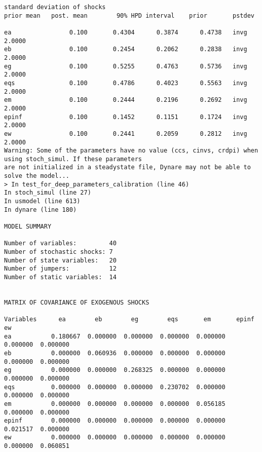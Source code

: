 \documentclass[]{article}
\begin{document}
\begin{verbatim}
standard deviation of shocks
prior mean   post. mean        90% HPD interval    prior       pstdev

ea                0.100       0.4304      0.3874      0.4738   invg        2.0000
eb                0.100       0.2454      0.2062      0.2838   invg        2.0000
eg                0.100       0.5255      0.4763      0.5736   invg        2.0000
eqs               0.100       0.4786      0.4023      0.5563   invg        2.0000
em                0.100       0.2444      0.2196      0.2692   invg        2.0000
epinf             0.100       0.1452      0.1151      0.1724   invg        2.0000
ew                0.100       0.2441      0.2059      0.2812   invg        2.0000
Warning: Some of the parameters have no value (ccs, cinvs, crdpi) when using stoch_simul. If these parameters
are not initialized in a steadystate file, Dynare may not be able to solve the model... 
> In test_for_deep_parameters_calibration (line 46)
In stoch_simul (line 27)
In usmodel (line 613)
In dynare (line 180) 

MODEL SUMMARY

Number of variables:         40
Number of stochastic shocks: 7
Number of state variables:   20
Number of jumpers:           12
Number of static variables:  14


MATRIX OF COVARIANCE OF EXOGENOUS SHOCKS

Variables      ea        eb        eg        eqs       em       epinf      ew    
ea           0.180667  0.000000  0.000000  0.000000  0.000000  0.000000  0.000000
eb           0.000000  0.060936  0.000000  0.000000  0.000000  0.000000  0.000000
eg           0.000000  0.000000  0.268325  0.000000  0.000000  0.000000  0.000000
eqs          0.000000  0.000000  0.000000  0.230702  0.000000  0.000000  0.000000
em           0.000000  0.000000  0.000000  0.000000  0.056185  0.000000  0.000000
epinf        0.000000  0.000000  0.000000  0.000000  0.000000  0.021517  0.000000
ew           0.000000  0.000000  0.000000  0.000000  0.000000  0.000000  0.060851


\end{verbatim}
\end{document}
